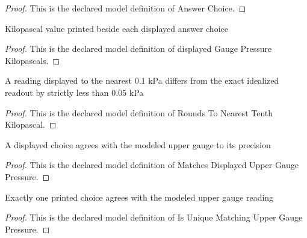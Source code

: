 \begin{proof}
  This is the declared model definition of Answer Choice.
\end{proof}
\begin{definition}
  \label{def:physics:phyx-mini-0724:phyxminiproblems-problemphyxmini0724-displayedgaugepressurekilopascals}
  Kilopascal value printed beside each displayed answer choice
\end{definition}
\begin{proof}
  This is the declared model definition of displayed Gauge Pressure Kilopascals.
\end{proof}
\begin{definition}
  \label{def:physics:phyx-mini-0724:phyxminiproblems-problemphyxmini0724-roundstonearesttenthkilopascal}
  A reading displayed to the nearest 0.1 kPa differs from the exact idealized readout by strictly less than 0.05 kPa
\end{definition}
\begin{proof}
  This is the declared model definition of Rounds To Nearest Tenth Kilopascal.
\end{proof}
\begin{definition}
  \label{def:physics:phyx-mini-0724:phyxminiproblems-problemphyxmini0724-matchesdisplayeduppergaugepressure}
  A displayed choice agrees with the modeled upper gauge to its precision
\end{definition}
\begin{proof}
  This is the declared model definition of Matches Displayed Upper Gauge Pressure.
\end{proof}
\begin{definition}
  \label{def:physics:phyx-mini-0724:phyxminiproblems-problemphyxmini0724-isuniquematchinguppergaugepressure}
  Exactly one printed choice agrees with the modeled upper gauge reading
\end{definition}
\begin{proof}
  This is the declared model definition of Is Unique Matching Upper Gauge Pressure.
\end{proof}
